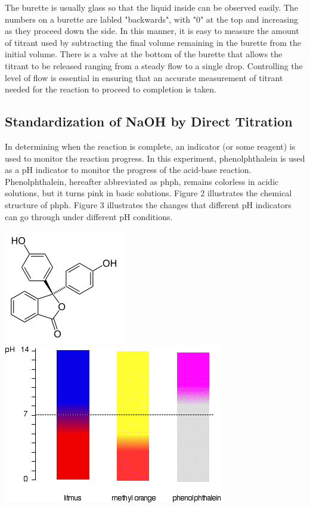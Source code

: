 \documentclass{article}
\begin{document}
The burette is usually glass so that the liquid inside can be observed easily.
The numbers on a burette are labled "backwards", with "0" at the top and
increasing as they proceed down the side. In this manner, it is easy to measure
the amount of titrant used by subtracting the final volume remaining in the
burette from the initial volume. There is a valve at the bottom of the burette
that allows the titrant to be released ranging from a steady flow to a single
drop. Controlling the level of flow is essential in ensuring that an accurate
measurement of titrant needed for the reaction to proceed to completion is
taken.

\subsection{Standardization of NaOH by Direct Titration}
In determining when the reaction is complete, an indicator (or some reagent) is used to monitor the
reaction progress. In this experiment, phenolphthalein is used as a pH indicator to monitor the
progress of the acid-base reaction. Phenolphthalein, hereafter abbreviated as phph, remains
colorless in acidic solutions, but it turns pink in basic solutions. Figure 2 illustrates the
chemical structure of phph. Figure 3 illustrates the changes that different pH indicators can go
through under different pH conditions.
\begin{center}
        \includegraphics[scale=0.6]{phph}
        \includegraphics[scale=0.5]{phph_color}
\end{center}
\end{document}
